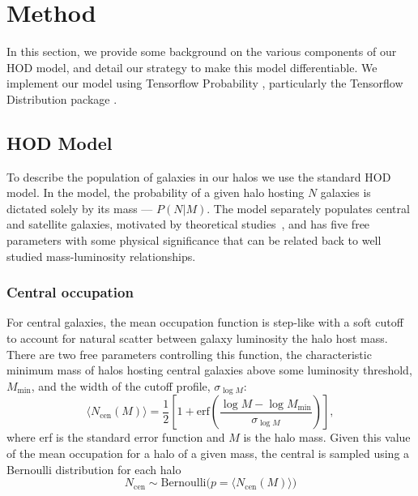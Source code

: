 \documentclass[a4paper,usenatbib]{mnras}
\newcommand{\CH}[1]{{\color{green}CH: #1}}
\begin{document}
\section{Method}
\label{sec:methods}

In this section, we provide some background on the various components of our HOD model, and detail our strategy to make this model differentiable. We implement our model using Tensorflow Probability \citep{2016arXiv161009787T,morgan2018probabilistic}, particularly the Tensorflow Distribution package \citep{2017arXiv171110604D}. 

\subsection{HOD Model} \label{sec:hod}

To describe the population of galaxies in our halos we use the standard 
\cite{2007zheng} HOD model.
In the \cite{2007zheng} model, the probability of a given halo hosting 
$N$ galaxies is dictated solely by its mass --- $P(N|M)$.
The model separately populates central and satellite galaxies, motivated by
theoretical studies~\citep{kravtsov2004, 2005zheng}, and has five free parameters
with some physical significance that
can be related back to well studied mass-luminosity relationships.

\subsubsection{Central occupation}

For central galaxies, the mean occupation function is step-like with a soft cutoff to account for natural scatter between galaxy luminosity the halo host mass. There are two free parameters controlling this function, the characteristic minimum mass of halos hosting central galaxies above some luminosity threshold, $M_\textrm{min}$, and the width of the cutoff profile, $\sigma_{\log M}$:
\begin{equation}
    \langle N_\textrm{cen}(M) \rangle = \frac{1}{2} \left[ 1 + \textrm{erf}\left( \frac{\log M - \log M_\textrm{min}}{\sigma_{\log M}}\right)\right],
    \label{eq:ncen}
\end{equation}
where erf is the standard error function and $M$ is the halo mass. 
Given this value of the mean occupation for a halo of a given mass, the central is sampled using a Bernoulli distribution for each halo
\begin{equation}
    N_\textrm{cen} \sim \textrm{Bernoulli}\big( p = \langle N_\textrm{cen}(M) \rangle \big)
    \label{eq:ncensample}
\end{equation}
\end{document}
